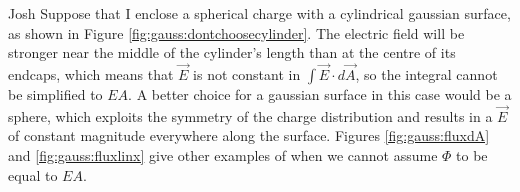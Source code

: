 \begin{studentOpinion}{Josh}
Suppose that I enclose a spherical charge with a cylindrical gaussian surface, as shown in Figure \ref{fig:gauss:dontchoosecylinder}. The electric field will be stronger near the middle of the cylinder's length than at the centre of its endcaps, which means that $\vec E$ is not constant in $\int \vec E \cdot d \vec A$, so the integral cannot be simplified to $EA$. A better choice for a gaussian surface in this case would be a sphere, which exploits the symmetry of the charge distribution and results in a $\vec E$ of constant magnitude everywhere along the surface. Figures \ref{fig:gauss:fluxdA} and \ref{fig:gauss:fluxlinx} give other examples of when we cannot assume $\Phi$ to be equal to $EA$.
	
\end{studentOpinion}

